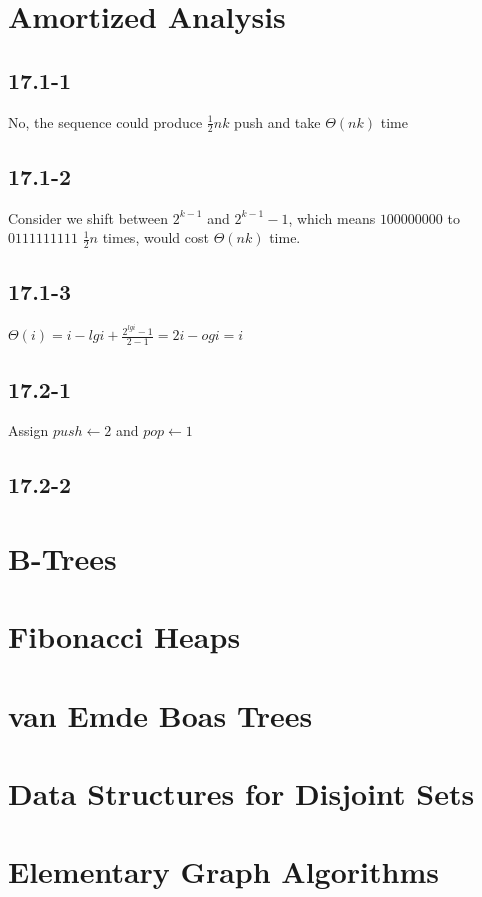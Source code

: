 \documentclass[]{article}
\begin{document}
\section{Amortized Analysis}
\subsection{17.1-1}
No, the sequence could produce $\frac{1}{2}nk$ push and take $\Theta(nk)$ time

\subsection{17.1-2}
Consider we shift between $2^{k-1}$ and $2^{k-1} - 1$, which means $100000000$ to $0111111111$ $\frac{1}{2}n$ times, would cost $\Theta(nk)$ time.

\subsection{17.1-3}
$\Theta(i) = i - lgi + \frac{2^{lgi}-1}{2-1} = 2i - ogi = i$

\subsection{17.2-1}
Assign $push \leftarrow 2$ and $pop \leftarrow 1$

\subsection{17.2-2}


\section{B-Trees}
\section{Fibonacci Heaps}
\section{van Emde Boas Trees}
\section{Data Structures for Disjoint Sets}

\section{Elementary Graph Algorithms}
\end{document}
